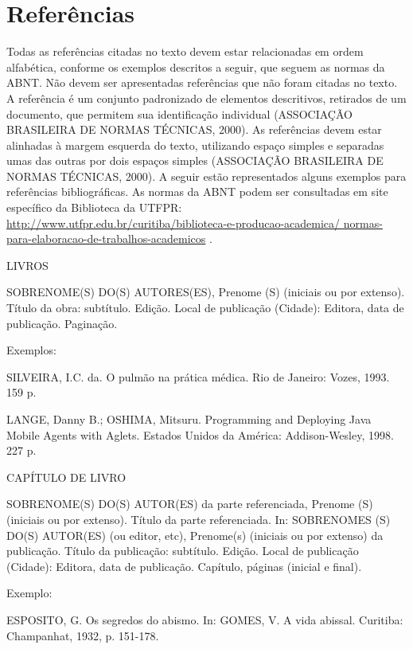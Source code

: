 \chapter{Refer\^encias}
\label{chap:ref}


Todas as referências citadas no texto devem estar relacionadas em ordem alfabética, conforme os exemplos descritos a seguir, que seguem as normas da ABNT. Não devem ser apresentadas referências que não foram citadas no texto.
A referência é um conjunto padronizado de elementos descritivos, retirados de um documento, que permitem sua identificação individual (ASSOCIAÇÃO BRASILEIRA DE NORMAS TÉCNICAS, 2000). As referências devem estar alinhadas à margem esquerda do texto, utilizando espaço simples e separadas umas das outras por dois espaços simples (ASSOCIAÇÃO BRASILEIRA DE NORMAS TÉCNICAS, 2000).
A seguir estão representados alguns exemplos para referências bibliográficas. As normas da ABNT podem ser consultadas em site específico da Biblioteca da UTFPR: \\ \url{http://www.utfpr.edu.br/curitiba/biblioteca-e-producao-academica/ normas-para-elaboracao-de-trabalhos-academicos} . 

LIVROS

SOBRENOME(S) DO(S) AUTORES(ES), Prenome (S) (iniciais ou por extenso). Título da obra: subtítulo. Edição. Local de publicação (Cidade): Editora, data de publicação. Paginação.

Exemplos:

SILVEIRA, I.C. da. O pulmão na prática médica. Rio de Janeiro: Vozes, 1993. 159 p.


LANGE, Danny B.; OSHIMA, Mitsuru. Programming and Deploying Java Mobile Agents with Aglets. Estados Unidos da América: Addison-Wesley, 1998. 227 p.


CAPÍTULO DE LIVRO

SOBRENOME(S) DO(S) AUTOR(ES) da parte referenciada, Prenome (S) (iniciais ou por extenso). Título da parte referenciada. In: SOBRENOMES (S) DO(S) AUTOR(ES) (ou editor, etc), Prenome(s) (iniciais ou por extenso) da publicação. Título da publicação: subtítulo. Edição. Local de publicação (Cidade): Editora, data de publicação. Capítulo, páginas (inicial e final).


Exemplo:

ESPOSITO, G. Os segredos do abismo. In: GOMES, V. A vida abissal. Curitiba: Champanhat, 1932, p. 151-178.



